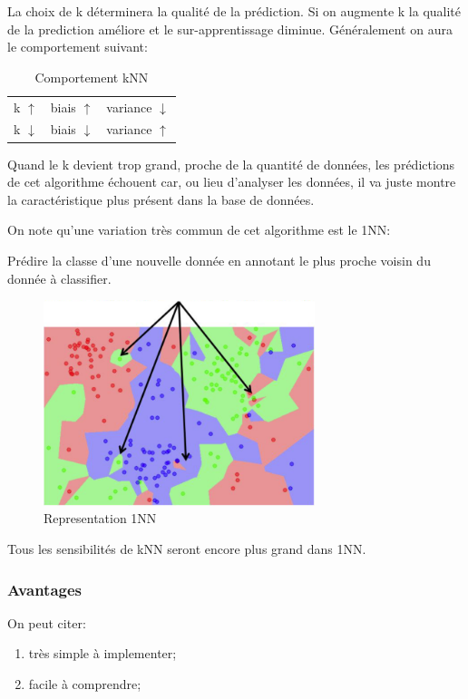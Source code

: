 \documentclass{article}
\begin{document}
La choix de k déterminera la qualité de la prédiction. Si on augmente k la qualité de la prediction améliore et le sur-apprentissage diminue. Généralement on aura le comportement suivant:
\begin{table}[H]
    \centering\begin{tabular}{lll}
        k $\uparrow  $ & biais $\uparrow  $ & variance $\downarrow$\\
        k $\downarrow$ & biais $\downarrow$ & variance $\uparrow$\\
    \end{tabular}
    \caption{Comportement kNN}
\end{table}
\begin{remark}
    Quand le k devient trop grand, proche de la quantité de données, les prédictions de cet algorithme échouent car, ou lieu d'analyser les données, il va juste montre la caractéristique plus présent dans la base de données.
\end{remark}
On note qu'une variation très commun de cet algorithme est le 1NN:
\begin{definition}
    Prédire la classe d'une nouvelle donnée en annotant le plus proche voisin du donnée à classifier.
    \begin{figure}[H]
        \centering
        \includegraphics[height=60mm]{images/1NN_diagram.png}
        \caption{Representation 1NN}
    \end{figure}
\end{definition}
\begin{phrase}
    Tous les sensibilités de kNN seront encore plus grand dans 1NN.
\end{phrase}

\subsubsection{Avantages}
On peut citer:
\begin{enumerate}[noitemsep, rightmargin=\leftmargin]
    \item très simple à implementer;
    \item facile à comprendre;
\end{enumerate}
\end{document}

